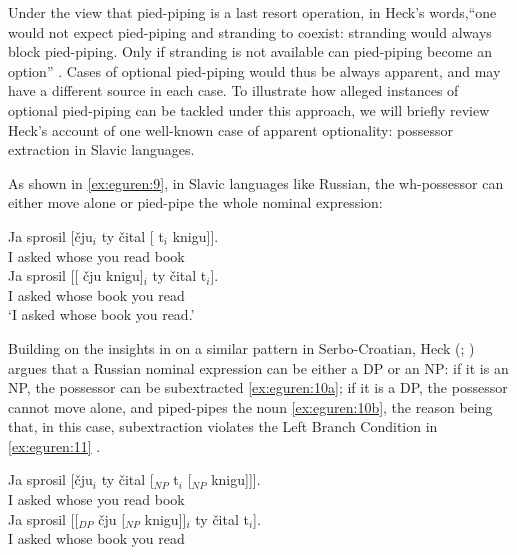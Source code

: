 \documentclass[output=paper,colorlinks,citecolor=brown]{langscibook}
\begin{document}
Under the view that pied-piping is a last resort operation, in Heck's words,``one would not expect pied-piping and stranding to coexist: stranding would always block pied-piping. Only if stranding is not available can pied-piping become an option'' \citep[95]{heck2009certain}. Cases of optional pied-piping would thus be always apparent, and may have a different source in each case. To illustrate how alleged instances of optional pied-piping can be tackled under this approach, we will briefly review Heck’s account of one well-known case of apparent optionality: possessor extraction in Slavic languages.

As shown in \ref{ex:eguren:9}, in Slavic languages like Russian, the wh-possessor can either move alone or pied-pipe the whole nominal expression:

\begin{exe} 
    \ex\label{ex:eguren:9} 
    \begin{xlist}
            \ex
\gll Ja	sprosil	[čju$_i$ ty	čital {[ t$_i$} knigu]].\\
     I	asked	 whose	you	read {} book\\
            \ex
\gll Ja	sprosil	{[[ čju	knigu]$_i$}	ty	čital  t$_i$].\\
    I	asked  {whose	book} you	read {}\\
    \glt `I asked whose book you read.'	
    \end{xlist}
\end{exe}

Building on the insights in \citet{bovskovic2004careful} on a similar pattern in Serbo-Croatian,  Heck (\citeyear[294]{heck2008pied}; \citeyear[fn. 50]{heck2009certain}) argues that a Russian nominal expression can be either a DP or an NP: if it is an NP, the possessor can be subextracted \ref{ex:eguren:10a}; if it is a DP, the possessor cannot move alone, and piped-pipes the noun \ref{ex:eguren:10b}, the reason being that, in this case, subextraction violates the Left Branch Condition in \ref{ex:eguren:11} \citep[121]{heck2008pied}. 

\begin{exe} 
    \ex\label{ex:eguren:10} 
    \begin{xlist}
            \ex\label{ex:eguren:10a}
\gll Ja	sprosil	{[čju$_i$} ty	čital{ [$_{NP}$ t$_i$} [$_{NP}$ knigu]]].\\
     	I	asked whose 	you	read	{}			book\\
            \ex\label{ex:eguren:10b}
\gll Ja	sprosil [{[$_{DP}$} {čju} {[$_{NP}$} {knigu}]]$_i$	ty	čital  t$_i$].\\
   I	asked {} whose {} book	you	read\\
\end{xlist}
\end{exe}
\end{document}
